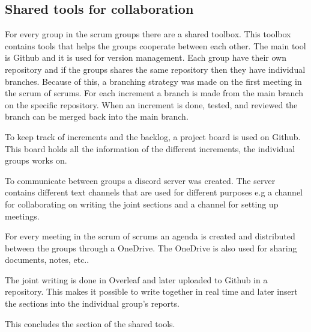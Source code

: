 \subsection{Shared tools for collaboration}\label{sub:shared-tools-for-collaboration}
For every group in the scrum groups there are a shared toolbox.
This toolbox contains tools that helps the groups cooperate between each other.
The main tool is Github and it is used for version management.  
Each group have their own repository and if the groups shares the same repository then they have individual branches.
Because of this, a branching strategy was made on the first meeting in the scrum of scrums.
For each increment a branch is made from the main branch on the specific repository. 
When an increment is done, tested, and reviewed the branch can be merged back into the main branch.

To keep track of increments and the backlog, a project board is used on Github.
This board holds all the information of the different increments, the individual groups works on.

To communicate between groups a discord server was created.
The server contains different text channels that are used for different purposes e.g a channel for collaborating on writing the joint sections and a channel for setting up meetings.

For every meeting in the scrum of scrums an agenda is created and distributed between the groups through a OneDrive.
The OneDrive is also used for sharing documents, notes, etc..

The joint writing is done in Overleaf and later uploaded to Github in a repository.
This makes it possible to write together in real time and later insert the sections into the individual group's reports.

This concludes the section of the shared tools.
